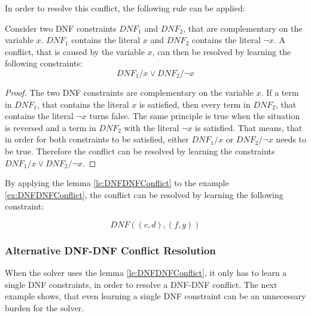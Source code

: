 In order to resolve this conflict, the following rule can be applied:

\begin{lemma}
\begin{leftbar}
Consider two DNF constraints $DNF_1$ and $DNF_2$, that are complementary on the variable $x$. $DNF_1$ contains the literal $x$ and $DNF_2$ contains the literal $\neg x$. A conflict, that is caused by the variable $x$, can then be resolved by learning the following constraints:
\begin{displaymath}
DNF_1 / x \vee DNF_2 / \neg x
\end{displaymath}
\end{leftbar}
\label{le:DNFDNFConflict}
\end{lemma}

\begin{proof}
The two DNF constraints are complementary on the variable $x$. If a term in $DNF_1$, that contains the literal $x$ is satisfied, then every term in $DNF_2$, that contains the literal $\neg x$ turns false. The same principle is true when the situation is reversed and a term in $DNF_2$ with the literal $\neg x$ is satisfied. That means, that in order for both constraints to be satisfied, either $DNF_1/x$ or $DNF_2/\neg x$ needs to be true. Therefore the conflict can be resolved by learning the constraints $DNF_1 / x \vee DNF_2 / \neg x$.
\end{proof}

By applying the lemma \ref{le:DNFDNFConflict} to the example \ref{ex:DNFDNFConflict}, the conflict can be resolved by learning the following constraint:
\begin{leftbar}
\begin{displaymath}
 DNF ((c,d),(f,g))
\end{displaymath}
\end{leftbar}

\newpage
\subsubsection{Alternative DNF-DNF Conflict Resolution}

When the solver uses the lemma \ref{le:DNFDNFConflict}, it only has to learn a single DNF constraints, in order to resolve a DNF-DNF conflict. The next example shows, that even learning a single DNF constraint can be an unnecessary burden for the solver.

